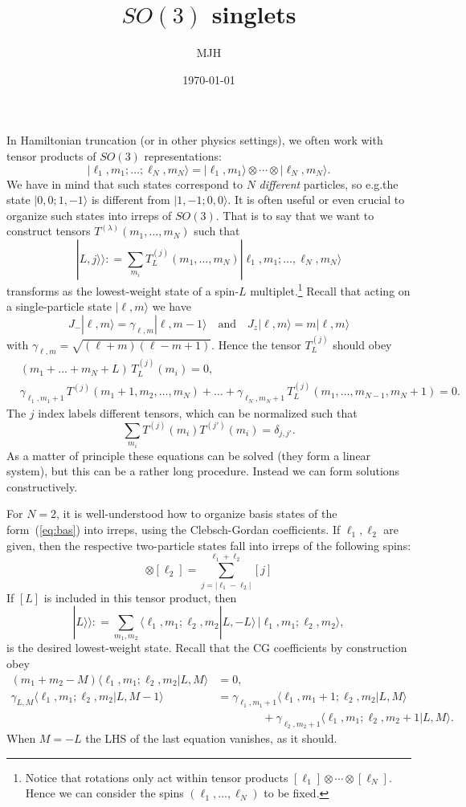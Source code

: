 \documentclass[10pt]{article}
\theoremstyle{plain}
\theoremstyle{remark}
\def\qaq{\quad \text{and} \quad}
\newcommand{\brakket}[2]{\langle #1|#2\rangle}
\newcommand{\ket}[1]{|#1\rangle}
\def\ldef{\mathrel{\mathop:}=}
\newcommand{\reef}[1]{(\ref{#1})}
\def\beq{\begin{equation}}
\def\eeq{\end{equation}}
\def\nn{\nonumber}
\def\bsub{\begin{subequations}}
\def\esub{\end{subequations}}
\def\la{\lambda}
\def\ga{\gamma}
\def\l{\ell}
\begin{document}
\title{$SO(3)$ singlets}
\author{MJH}
\date\today

\maketitle

In Hamiltonian truncation (or in other physics settings), we often work with tensor products of $SO(3)$ representations:
\beq
\label{eq:bas}
\ket{\ell_1,m_1;\ldots;\ell_N,m_N} = \ket{\ell_1,m_1} \otimes \dotsm \otimes \ket{\ell_N,m_N}.
\eeq
We have in mind that such states correspond to $N$ \emph{different} particles, so e.g.\@ the state $\ket{0,0;1,-1}$ is different from $\ket{1,-1;0,0}$. It is often useful or even crucial to organize such states into irreps of $SO(3)$. That is to say that we want to construct tensors $T^{(\la)}(m_1,\ldots,m_N)$ such that
\beq
\ket{L,j}\!\rangle \ldef \sum_{m_i} T_L^{(j)}(m_1,\ldots,m_N) \ket{\l_1,m_1;\ldots,\l_N,m_N}
\eeq
transforms as the lowest-weight state of a spin-$L$ multiplet.\footnote{Notice that rotations only act within tensor products $[\ell_1] \otimes \dotsm \otimes [\ell_N]$. Hence we can consider the spins $(\ell_1,\ldots,\ell_N)$ to be fixed.}
Recall that acting on a single-particle state $\ket{\l,m}$ we have
\beq
J_{-} \ket{\ell,m} = \gamma_{\ell,m} \ket{\ell,m-1}
\qaq
J_z \ket{\ell,m} = m \ket{\ell,m}
\eeq
with $\gamma_{\l,m} = \sqrt{(\ell+m)(\ell-m+1)}$. Hence the tensor $T^{(j)}_L$ should obey
\bsub
\label{eq:imp}
\begin{align}
&(m_1 + \ldots + m_N + L) \, T^{(j)}_L(m_i) = 0, \label{eq:ia}\\
&\ga_{\l_1,m_1+1} \, T^{(j)}(m_1+1,m_2,\ldots,m_N) + \ldots + \ga_{\l_N,m_N+1}\, T^{(j)}_L(m_1,\ldots,m_{N-1},m_N+1) = 0. \label{eq:ib}
\end{align}
\esub
The $j$ index labels different tensors, which can be normalized such that
\beq
\sum_{m_i} T^{(j)}(m_i) T^{(j')}(m_i) = \delta_{j,j'}.
\eeq
As a matter of principle these equations can be solved (they form a linear system), but this can be a rather long procedure. Instead we can form solutions constructively.

For $N=2$, it is well-understood how to organize basis states of the form~\reef{eq:bas} into irreps, using the Clebsch-Gordan coefficients. If $\ell_1,\ell_2$ are given, then the respective two-particle states fall into irreps of the following spins:
\beq
[\ell_1] \otimes [\ell_2] = \sum_{j = |\ell_1 - \ell_2|}^{\ell_1 + \ell_2} [j]
\eeq
If $[L]$ is included in this tensor product, then
\beq
\ket{L}\!\rangle \ldef \sum_{m_1,m_2} \brakket{\ell_1,m_1;\ell_2,m_2}{L,-L} \, \ket{\ell_1,m_1;\ell_2,m_2},
\eeq
is the desired lowest-weight state. Recall that the CG coefficients by construction obey
\bsub
\begin{align}
(m_1 + m_2 - M) \brakket{\l_1,m_1;\l_2,m_2}{L,M} &= 0,\label{eq:cga}\\
  \ga_{L,M} \brakket{\l_1,m_1;\l_2,m_2}{L,M-1} &= \ga_{\l_1,m_1+1}\brakket{\l_1,m_1+1;\l_2,m_2}{L,M} \nn \\
  &\qquad\qquad+ \ga_{\l_2,m_2+1}\brakket{\l_1,m_1;\l_2,m_2+1}{L,M}\label{eq:cgb}.
\end{align}
\esub
When $M = -L$ the LHS of the last equation vanishes, as it should. 
\end{document}
